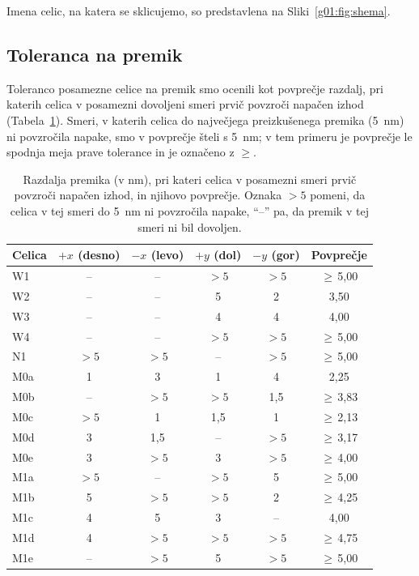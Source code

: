 Imena celic, na katera se sklicujemo, so predstavlena na Sliki~\ref{g01:fig:shema}.


\subsection{Toleranca na premik}

Toleranco posamezne celice na premik smo ocenili kot povprečje razdalj, pri katerih celica v posamezni dovoljeni smeri prvič povzroči napačen izhod (Tabela~\ref{g01:tab:toleranca}).
Smeri, v katerih celica do največjega preizkušenega premika (\SI{5}{\nano\metre}) ni povzročila napake, smo v povprečje šteli s \SI{5}{\nano\metre}; v tem primeru je povprečje le spodnja meja prave tolerance in je označeno z $\geq$.

\begin{table}[htbp]
\centering
\small
\caption{
    Razdalja premika (v \si{\nano\metre}), pri kateri celica v posamezni smeri prvič povzroči napačen izhod, in njihovo povprečje.
    Oznaka $>5$ pomeni, da celica v tej smeri do \SI{5}{\nano\metre} ni povzročila napake, \enquote{--} pa, da premik v tej smeri ni bil dovoljen.
}
\label{g01:tab:toleranca}
\begin{tabular}{lccccc}
\toprule
Celica & $+x$ (desno) & $-x$ (levo) & $+y$ (dol) & $-y$ (gor) & Povprečje \\
\midrule
W1  & --    & --    & $>5$  & $>5$  & $\geq$\,5,00 \\
W2  & --    & --    & 5     & 2     & 3,50 \\
W3  & --    & --    & 4     & 4     & 4,00 \\
W4  & --    & --    & $>5$  & $>5$  & $\geq$\,5,00 \\
\midrule
N1  & $>5$  & $>5$  & --    & $>5$  & $\geq$\,5,00 \\
\midrule
M0a & 1     & 3     & 1     & 4     & 2,25 \\
M0b & --    & $>5$  & $>5$  & 1,5   & $\geq$\,3,83 \\
M0c & $>5$  & 1     & 1,5   & 1     & $\geq$\,2,13 \\
M0d & 3     & 1,5   & --    & $>5$  & $\geq$\,3,17 \\
M0e & 3     & $>5$  & 3     & $>5$  & $\geq$\,4,00 \\
\midrule
M1a & $>5$  & --    & $>5$  & 5     & $\geq$\,5,00 \\
M1b & 5     & $>5$  & $>5$  & 2     & $\geq$\,4,25 \\
M1c & 4     & 5     & 3     & --    & 4,00 \\
M1d & 4     & $>5$  & $>5$  & $>5$  & $\geq$\,4,75 \\
M1e & --    & $>5$  & 5     & $>5$  & $\geq$\,5,00 \\
\bottomrule
\end{tabular}
\end{table}

